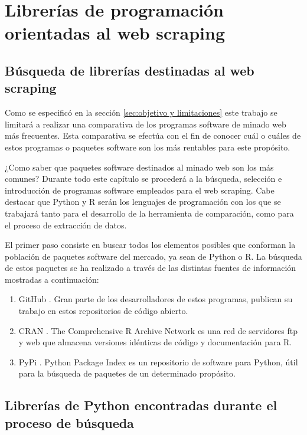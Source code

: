 \chapter{Librerías de programación orientadas al web scraping}
\label{cha:librerias de programacion orientadas al web scraping}

\section{Búsqueda de librerías destinadas al web scraping}
\label{sec:busqueda de librerias destinadas al web scraping}

Como se especificó en la sección \ref{sec:objetivo y limitaciones} este trabajo se limitará a realizar
una comparativa de los programas software de minado web más frecuentes. Esta comparativa se efectúa con el
fin de conocer cuál o cuáles de estos programas o paquetes software son los más rentables para este propósito.

¿Como saber que paquetes software destinados al minado web son los más comunes? Durante todo este capítulo
se procederá a la búsqueda, selección e introducción de programas software empleados para el web scraping. 
Cabe destacar que Python y R serán los lenguajes de programación con los que se trabajará tanto para el 
desarrollo de la herramienta de comparación, como para el proceso de extracción de datos.

El primer paso consiste en buscar todos los elementos posibles que conforman la población de paquetes
software del mercado, ya sean de Python o R. La búsqueda de estos paquetes se ha realizado a través de las 
distintas fuentes de información mostradas a continuación:

\begin{enumerate}
  \item GitHub \cite{github}. Gran parte de los desarrolladores de estos programas, publican su trabajo en
  estos repositorios de código abierto.
  \item CRAN \cite{cran}. The Comprehensive R Archive Network es una red de servidores ftp y web que
  almacena versiones idénticas de código y documentación para R.
  \item PyPi \cite{pypi}. Python Package Index es un repositorio de software para Python, útil para la
  búsqueda de paquetes de un determinado propósito.
\end{enumerate}

\section{Librerías de Python encontradas durante el proceso de búsqueda}
\label{sec:librerias de python encontradas durante el proceso de busqueda}

